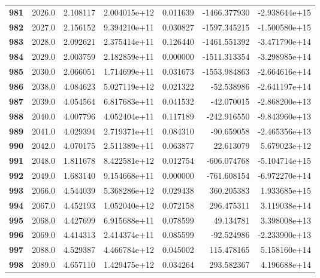 \documentclass{report}[12pt]
\begin{document}
\begin{center}
\begin{tabular}{lrrrrrr}
\textbf{981 } &         2026.0 &   2.108117 &  2.004015e+12 &    0.011639 & -1466.377930 & -2.938644e+15 \\
\textbf{982 } &         2027.0 &   2.156152 &  9.394210e+11 &    0.030827 & -1597.345215 & -1.500580e+15 \\
\textbf{983 } &         2028.0 &   2.092621 &  2.375414e+11 &    0.126440 & -1461.551392 & -3.471790e+14 \\
\textbf{984 } &         2029.0 &   2.003759 &  2.182859e+11 &    0.000000 & -1511.313354 & -3.298985e+14 \\
\textbf{985 } &         2030.0 &   2.066051 &  1.714699e+11 &    0.031673 & -1553.984863 & -2.664616e+14 \\
\textbf{986 } &         2038.0 &   4.084623 &  5.027119e+12 &    0.021322 &   -52.538986 & -2.641197e+14 \\
\textbf{987 } &         2039.0 &   4.054564 &  6.817683e+11 &    0.041532 &   -42.070015 & -2.868200e+13 \\
\textbf{988 } &         2040.0 &   4.007796 &  4.052404e+11 &    0.117189 &  -242.916550 & -9.843960e+13 \\
\textbf{989 } &         2041.0 &   4.029394 &  2.719371e+11 &    0.084310 &   -90.659058 & -2.465356e+13 \\
\textbf{990 } &         2042.0 &   4.070175 &  2.511389e+11 &    0.063877 &    22.613079 &  5.679023e+12 \\
\textbf{991 } &         2048.0 &   1.811678 &  8.422581e+12 &    0.012754 &  -606.074768 & -5.104714e+15 \\
\textbf{992 } &         2049.0 &   1.683140 &  9.154668e+11 &    0.000000 &  -761.608154 & -6.972270e+14 \\
\textbf{993 } &         2066.0 &   4.544039 &  5.368286e+12 &    0.029438 &   360.205383 &  1.933685e+15 \\
\textbf{994 } &         2067.0 &   4.452193 &  1.052040e+12 &    0.072158 &   296.475311 &  3.119038e+14 \\
\textbf{995 } &         2068.0 &   4.427699 &  6.915688e+11 &    0.078599 &    49.134781 &  3.398008e+13 \\
\textbf{996 } &         2069.0 &   4.414313 &  2.414374e+11 &    0.085599 &   -92.524986 & -2.233900e+13 \\
\textbf{997 } &         2088.0 &   4.529387 &  4.466784e+12 &    0.045002 &   115.478165 &  5.158160e+14 \\
\textbf{998 } &         2089.0 &   4.657110 &  1.429475e+12 &    0.034264 &   293.582367 &  4.196688e+14 \\

\end{tabular}
\end{center}
\end{document}

